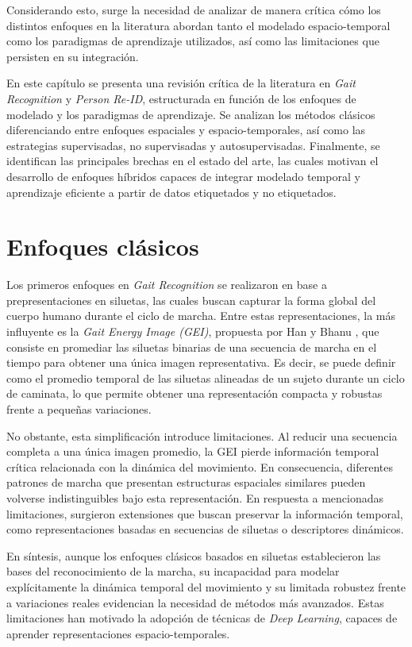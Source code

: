 Considerando esto, surge la necesidad de analizar de manera crítica cómo los distintos enfoques en la literatura abordan tanto el modelado espacio-temporal como los paradigmas de aprendizaje utilizados, así como las limitaciones que persisten en su integración.

En este capítulo se presenta una revisión crítica de la literatura en \textit{Gait Recognition} y \textit{Person Re-ID}, estructurada en función de los enfoques de modelado y los paradigmas de aprendizaje. Se analizan los métodos clásicos diferenciando entre enfoques espaciales y espacio-temporales, así como las estrategias supervisadas, no supervisadas y autosupervisadas. Finalmente, se identifican las principales brechas en el estado del arte, las cuales motivan el desarrollo de enfoques híbridos capaces de integrar modelado temporal y aprendizaje eficiente a partir de datos etiquetados y no etiquetados.

\section{Enfoques clásicos}

Los primeros enfoques en \textit{Gait Recognition} se realizaron en base a prepresentaciones en siluetas, las cuales buscan capturar la forma global del cuerpo humano durante el ciclo de marcha. Entre estas representaciones, la más influyente es la \textit{Gait Energy Image (GEI)}, propuesta por Han y Bhanu \cite{Han2006GEI}, que consiste en promediar las siluetas binarias de una secuencia de marcha en el tiempo para obtener una única imagen representativa. Es decir, se puede definir como el promedio temporal de las siluetas alineadas de un sujeto durante un ciclo de caminata, lo que permite obtener una representación compacta y robustas frente a pequeñas variaciones. 

No obstante, esta simplificación introduce limitaciones. Al reducir una secuencia completa a una única imagen promedio, la GEI pierde información temporal crítica relacionada con la dinámica del movimiento. En consecuencia, diferentes patrones de marcha que presentan estructuras espaciales similares pueden volverse indistinguibles bajo esta representación. En respuesta a mencionadas limitaciones, surgieron extensiones que buscan preservar la información temporal, como representaciones basadas en secuencias de siluetas o descriptores dinámicos.

En síntesis, aunque los enfoques clásicos basados en siluetas establecieron las bases del reconocimiento de la marcha, su incapacidad para modelar explícitamente la dinámica temporal del movimiento y su limitada robustez frente a variaciones reales evidencian la necesidad de métodos más avanzados. Estas limitaciones han motivado la adopción de técnicas de \textit{Deep Learning}, capaces de aprender representaciones espacio-temporales.


